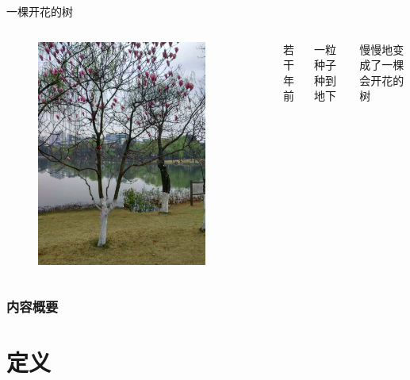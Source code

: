 \documentclass{beamer}
\begin{document}
\begin{frame}{一棵开花的树}
	\begin{columns}
			\begin{figure}[H]
				\includegraphics[width=0.85\textwidth]{tree.png}
				\end{figure}
		若干年前
		
		一粒种子种到地下
		
		慢慢地变成了一棵会开花的树
	\end{columns}
\end{frame}

\begin{frame}
  \frametitle{内容概要}

  \tableofcontents
\end{frame}

\section{定义}
\end{document}
